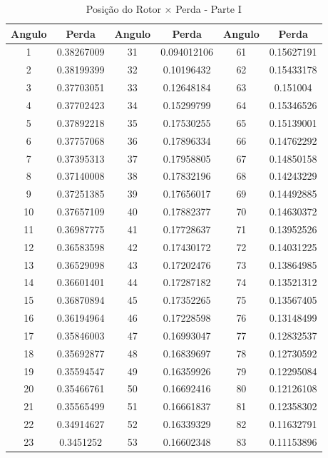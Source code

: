 \documentclass[
	12pt,				%
	openright,			%
	twoside,			%
	a4paper,			%
	english,			%
	french,				%
	spanish,			%
	brazil,				%
	]{abntex2}
\begin{document}
\begin{apendicesenv}
\begin{table}[H]
\begin{tabular}{c c| c c | c c}
\end{tabular}
\end{table}

\newpage
\begin{table}[H]
\caption{Posição do Rotor $\times$  Perda - Parte I \label{tab:pr_i}}
\centering
\begin{tabular}{c c| c c | c c}
Angulo & Perda & Angulo & Perda & Angulo & Perda \\
\hline 
1 & 0.38267009 & 31 & 0.094012106 & 61 & 0.15627191\\
2 & 0.38199399 & 32 & 0.10196432 & 62 & 0.15433178\\
3 & 0.37703051 & 33 & 0.12648184 & 63 & 0.151004\\
4 & 0.37702423 & 34 & 0.15299799 & 64 & 0.15346526\\
5 & 0.37892218 & 35 & 0.17530255 & 65 & 0.15139001\\
6 & 0.37757068 & 36 & 0.17896334 & 66 & 0.14762292\\
7 & 0.37395313 & 37 & 0.17958805 & 67 & 0.14850158\\
8 & 0.37140008 & 38 & 0.17832196 & 68 & 0.14243229\\
9 & 0.37251385 & 39 & 0.17656017 & 69 & 0.14492885\\
10 & 0.37657109 & 40 & 0.17882377 & 70 & 0.14630372\\
11 & 0.36987775 & 41 & 0.17728637 & 71 & 0.13952526\\
12 & 0.36583598 & 42 & 0.17430172 & 72 & 0.14031225\\
13 & 0.36529098 & 43 & 0.17202476 & 73 & 0.13864985\\
14 & 0.36601401 & 44 & 0.17287182 & 74 & 0.13521312\\
15 & 0.36870894 & 45 & 0.17352265 & 75 & 0.13567405\\
16 & 0.36194964 & 46 & 0.17228598 & 76 & 0.13148499\\
17 & 0.35846003 & 47 & 0.16993047 & 77 & 0.12832537\\
18 & 0.35692877 & 48 & 0.16839697 & 78 & 0.12730592\\
19 & 0.35594547 & 49 & 0.16359926 & 79 & 0.12295084\\
20 & 0.35466761 & 50 & 0.16692416 & 80 & 0.12126108\\
21 & 0.35565499 & 51 & 0.16661837 & 81 & 0.12358302\\
22 & 0.34914627 & 52 & 0.16339329 & 82 & 0.11632791\\
23 & 0.3451252 & 53 & 0.16602348 & 83 & 0.11153896\\

\end{tabular}
\end{table}
\end{apendicesenv}
\end{document}

